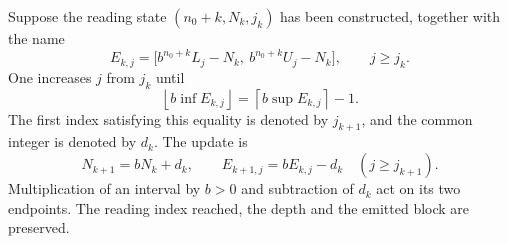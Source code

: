 Suppose the reading state \((n_0+k,N_k,j_k)\) has been constructed, together
with the name
\begin{equation}
 E_{k,j}=
 \bigl[b^{n_0+k}L_j-N_k,\ b^{n_0+k}U_j-N_k\bigr],
 \qquad j\geq j_k.
 \label{eq:residual-nombre-k}
\end{equation}
One increases \(j\) from \(j_k\) until
\[
 \left\lfloor b\inf E_{k,j}\right\rfloor
 =\left\lceil b\sup E_{k,j}\right\rceil-1.
\]
The first index satisfying this equality is denoted by \(j_{k+1}\), and the
common integer is denoted by \(d_k\). The update is
\begin{equation}
 N_{k+1}=bN_k+d_k,
 \qquad E_{k+1,j}=bE_{k,j}-d_k
 \quad(j\geq j_{k+1}).
 \label{eq:residual-actualizacion-exacta}
\end{equation}
Multiplication of an interval by \(b>0\) and subtraction of \(d_k\)
act on its two endpoints. The reading index reached,
the depth and the emitted block are preserved.

